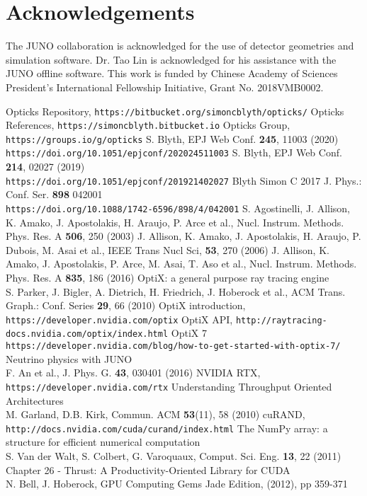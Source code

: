 \documentclass{webofc}
\begin{document}
\section*{Acknowledgements}
%
The JUNO collaboration is acknowledged for the use of detector 
geometries and simulation software. Dr. Tao Lin is acknowledged for his assistance with 
the JUNO offline software. 
This work is funded by Chinese Academy of Sciences President’s International Fellowship Initiative,
Grant No. 2018VMB0002.
%
%
%
\begin{thebibliography}{}
%
Opticks Repository, {\tt https://bitbucket.org/simoncblyth/opticks/}
Opticks References, {\tt https://simoncblyth.bitbucket.io}
Opticks Group, {\tt https://groups.io/g/opticks}
S. Blyth, EPJ Web Conf. {\bf 245}, 11003 (2020) \\
{\tt https://doi.org/10.1051/epjconf/202024511003}
S. Blyth, EPJ Web Conf. {\bf 214}, 02027 (2019) \\
{\tt https://doi.org/10.1051/epjconf/201921402027}
Blyth Simon C 2017 J. Phys.: Conf. Ser. {\bf 898} 042001 \\
{\tt https://doi.org/10.1088/1742-6596/898/4/042001}
%
%
%
%
%
%
%
S. Agostinelli, J. Allison, K. Amako, J. Apostolakis, H. Araujo, P. Arce et al., Nucl. Instrum. Methods. Phys. Res. A {\bf 506}, 250 (2003)
J. Allison, K. Amako, J. Apostolakis, H. Araujo, P. Dubois, M. Asai et al., IEEE Trans Nucl Sci, {\bf 53}, 270 (2006)
J. Allison, K. Amako, J. Apostolakis, P. Arce, M. Asai, T. Aso et al., Nucl. Instrum. Methods. Phys. Res. A {\bf 835}, 186 (2016)
%
%
%
%
%
OptiX: a general purpose ray tracing engine \\
S. Parker, J. Bigler, A. Dietrich, H. Friedrich, J. Hoberock et al., ACM Trans. Graph.: Conf. Series {\bf 29}, 66 (2010)
OptiX introduction, {\tt https://developer.nvidia.com/optix}
OptiX API, {\tt http://raytracing-docs.nvidia.com/optix/index.html}
%
OptiX 7 {\tt https://developer.nvidia.com/blog/how-to-get-started-with-optix-7/}
%
Neutrino physics with JUNO \\
F. An et al., J. Phys. G. {\bf 43}, 030401 (2016) 
NVIDIA RTX, {\tt https://developer.nvidia.com/rtx}
%
%
Understanding Throughput Oriented Architectures \\
M. Garland, D.B. Kirk, Commun. ACM {\bf 53}(11), 58 (2010) 
cuRAND, {\tt http://docs.nvidia.com/cuda/curand/index.html}
The NumPy array: a structure for efficient numerical computation \\
S. Van der Walt, S. Colbert, G. Varoquaux, Comput. Sci. Eng. {\bf 13}, 22 (2011)
%
Chapter 26 - Thrust: A Productivity-Oriented Library for CUDA \\
N. Bell, J. Hoberock, GPU Computing Gems Jade Edition, (2012), pp 359-371
%
%
\end{thebibliography}
%
\end{document}

